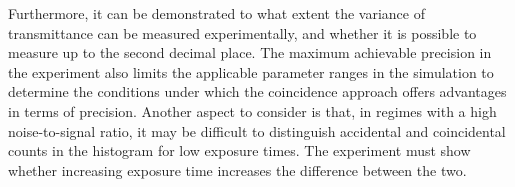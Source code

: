 Furthermore, it can be demonstrated to what extent the variance of transmittance can be measured experimentally, and whether it is possible to measure up to the second decimal place. The maximum achievable precision in the experiment also limits the applicable parameter ranges in the simulation to determine the conditions under which the coincidence approach offers advantages in terms of precision. \newline
Another aspect to consider is that, in regimes with a high noise-to-signal ratio, it may be difficult to distinguish accidental and coincidental counts in the histogram for low exposure times. The experiment must show whether increasing exposure time increases the difference between the two. 


